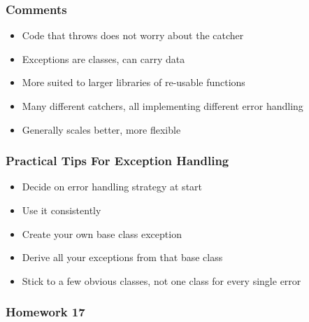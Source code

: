 \hypertarget{comments}{%
\subsubsection{Comments}\label{comments}}

\begin{itemize}
\tightlist
\item
  Code that throws does not worry about the catcher
\item
  Exceptions are classes, can carry data
\item
  More suited to larger libraries of re-usable functions
\item
  Many different catchers, all implementing different error handling
\item
  Generally scales better, more flexible
\end{itemize}

\hypertarget{practical-tips-for-exception-handling}{%
\subsubsection{Practical Tips For Exception
Handling}\label{practical-tips-for-exception-handling}}

\begin{itemize}
\tightlist
\item
  Decide on error handling strategy at start
\item
  Use it consistently
\item
  Create your own base class exception
\item
  Derive all your exceptions from that base class
\item
  Stick to a few obvious classes, not one class for every single error
\end{itemize}

\hypertarget{homework-17}{%
\subsubsection{Homework 17}\label{homework-17}}

